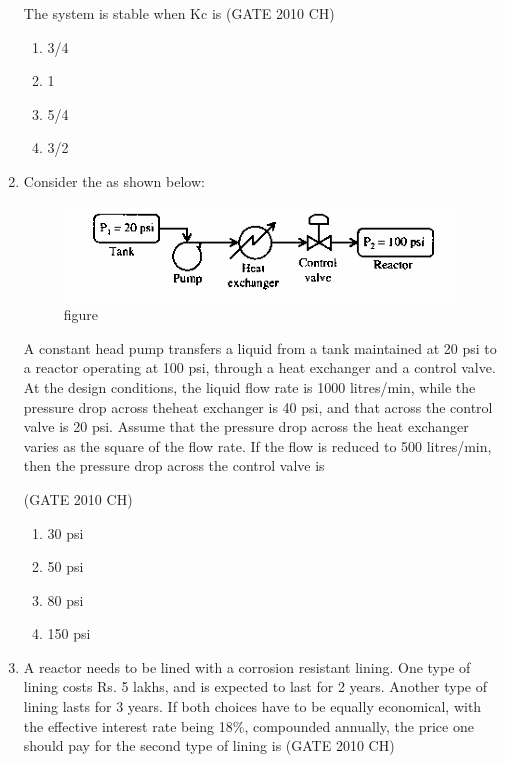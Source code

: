 \documentclass[journal,12pt,onecolumn]{exam}
\theoremstyle{remark}
\begin{document}
\begin{enumerate}
     The system is stable when Kc is
\hfill{(GATE 2010 CH)}\\
     \begin{enumerate}
         \item 3/4
         \item 1
         \item 5/4
         \item 3/2
         \end{enumerate}
\item 
  Consider the as shown below:
  
\begin{figure}[H]
    \centering
    \includegraphics[width=0.5\linewidth]{figs/Q.44 image.png}
    \caption{figure}
    \label{fig:figs/Q.44 image.png}
\end{figure}
  
    A constant head pump transfers a liquid from a tank maintained at 20 psi to a reactor operating at 100 psi, through a heat exchanger and a control valve. At the design conditions, the liquid flow rate is 1000 litres/min, while the pressure drop across theheat exchanger is 40 psi, and that across the control valve is 20 psi. Assume that the pressure drop across the heat exchanger varies as the square of the flow rate. If the flow is reduced to 500 litres/min, then the pressure drop across the control valve is
    
\hfill{(GATE 2010 CH)}\\

    \begin{enumerate}
        \item 30 psi
        \item 50 psi
        \item 80 psi
        \item 150 psi
    \end{enumerate}
\item 
   A reactor needs to be lined with a corrosion resistant lining. One type of lining costs Rs. 5 lakhs, and is expected to last for 2 years. Another type of lining lasts for 3 years. If both choices have to be equally economical, with the effective interest rate being 18\%, compounded annually, the price one should pay for the second type of lining is
   \hfill{(GATE 2010 CH)}\\


\end{enumerate}
\end{document}
